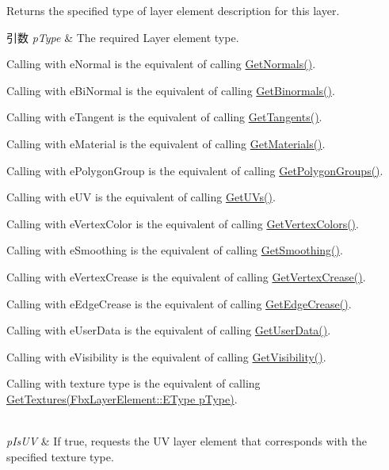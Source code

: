 Returns the specified type of layer element description for this layer. 
\begin{DoxyParams}{引数}
{\em p\+Type} & The required Layer element type.
\begin{DoxyItemize}
\item Calling with e\+Normal is the equivalent of calling \hyperlink{class_fbx_layer_ae29a7357ab32d3a298d85940e703b65d}{Get\+Normals()}.
\item Calling with e\+Bi\+Normal is the equivalent of calling \hyperlink{class_fbx_layer_a9b089342d79d32531aa27ec83b71a43d}{Get\+Binormals()}.
\item Calling with e\+Tangent is the equivalent of calling \hyperlink{class_fbx_layer_a6c1e9d8dead9600029e27d690ee0e662}{Get\+Tangents()}.
\item Calling with e\+Material is the equivalent of calling \hyperlink{class_fbx_layer_acb250792d05dbe8dde9a44d8d2ddea50}{Get\+Materials()}.
\item Calling with e\+Polygon\+Group is the equivalent of calling \hyperlink{class_fbx_layer_ab199f10be53e1c787ac36a3bc0619b60}{Get\+Polygon\+Groups()}.
\item Calling with e\+UV is the equivalent of calling \hyperlink{class_fbx_layer_aa7b54accfb183e671af671f297dfff7e}{Get\+U\+Vs()}.
\item Calling with e\+Vertex\+Color is the equivalent of calling \hyperlink{class_fbx_layer_a050877e12380125dda894a6136f04564}{Get\+Vertex\+Colors()}.
\item Calling with e\+Smoothing is the equivalent of calling \hyperlink{class_fbx_layer_ada25c7852f5f38e9a053b29858f450c8}{Get\+Smoothing()}.
\item Calling with e\+Vertex\+Crease is the equivalent of calling \hyperlink{class_fbx_layer_a6de0fbabb2845d0e90a0755c8e3382aa}{Get\+Vertex\+Crease()}.
\item Calling with e\+Edge\+Crease is the equivalent of calling \hyperlink{class_fbx_layer_ae2e4f8ccb8cb6ddc101bf01986b1661b}{Get\+Edge\+Crease()}.
\item Calling with e\+User\+Data is the equivalent of calling \hyperlink{class_fbx_layer_ac5420149207fd66e6b0e1808ee9b9d79}{Get\+User\+Data()}.
\item Calling with e\+Visibility is the equivalent of calling \hyperlink{class_fbx_layer_a3e2723477c9dab8c3c9abddcb4e1abf5}{Get\+Visibility()}.
\item Calling with texture type is the equivalent of calling \hyperlink{class_fbx_layer_a6c407cd486b08abafb7d966e9bb8dcf6}{Get\+Textures(\+Fbx\+Layer\+Element\+::\+E\+Type p\+Type)}. 
\end{DoxyItemize}\\
\hline
{\em p\+Is\+UV} & If {\ttfamily true}, requests the UV layer element that corresponds with the specified texture type. \\
\hline
\end{DoxyParams}
